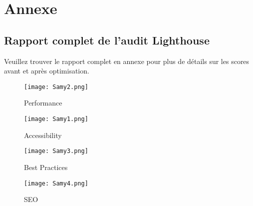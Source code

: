 \documentclass[12pt, a4paper]{article}
\begin{document}
\newpage
\section*{Annexe}
\subsection*{Rapport complet de l’audit Lighthouse}
Veuillez trouver le rapport complet en annexe pour plus de détails sur les scores avant et après optimisation.

 \begin{figure}[h!] %
    \centering %
    \texttt{[image: Samy2.png]} %
    \caption{Performance} %
    \label{Samy2.png} %
    \end{figure}
    \newpage

     \begin{figure}[h!] %
    \centering %
    \texttt{[image: Samy1.png]} %
    \caption{Accessibility} %
    \label{Samy1.png} %
    \end{figure}
    \newpage

     \begin{figure}[h!] %
    \centering %
    \texttt{[image: Samy3.png]} %
    \caption{Best Practices} %
    \label{Samy3.png} %
    \end{figure}
    \newpage


    \begin{figure}[h!] %
    \centering %
    \texttt{[image: Samy4.png]} %
    \caption{SEO} %
    \label{Samy4.png} %
    \end{figure}
    \newpage
\end{document}

